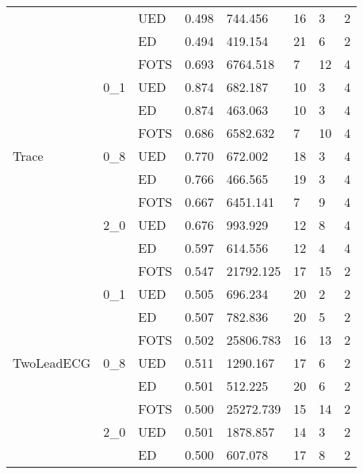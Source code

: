 \begin{tabular}{llllllll}
           &     & UED & 0.498 &   744.456 &             16 &            3 &           2 \\
           &     & ED & 0.494 &   419.154 &             21 &            6 &           2 \\
\cline{1-8}
\cline{2-8}
\multirow{9}{*}{Trace} & \multirow{3}{*}{0\_1} & FOTS & 0.693 &  6764.518 &              7 &           12 &           4 \\
           &     & UED & 0.874 &   682.187 &             10 &            3 &           4 \\
           &     & ED & 0.874 &   463.063 &             10 &            3 &           4 \\
\cline{2-8}
           & \multirow{3}{*}{0\_8} & FOTS & 0.686 &  6582.632 &              7 &           10 &           4 \\
           &     & UED & 0.770 &   672.002 &             18 &            3 &           4 \\
           &     & ED & 0.766 &   466.565 &             19 &            3 &           4 \\
\cline{2-8}
           & \multirow{3}{*}{2\_0} & FOTS & 0.667 &  6451.141 &              7 &            9 &           4 \\
           &     & UED & 0.676 &   993.929 &             12 &            8 &           4 \\
           &     & ED & 0.597 &   614.556 &             12 &            4 &           4 \\
\cline{1-8}
\cline{2-8}
\multirow{9}{*}{TwoLeadECG} & \multirow{3}{*}{0\_1} & FOTS & 0.547 & 21792.125 &             17 &           15 &           2 \\
           &     & UED & 0.505 &   696.234 &             20 &            2 &           2 \\
           &     & ED & 0.507 &   782.836 &             20 &            5 &           2 \\
\cline{2-8}
           & \multirow{3}{*}{0\_8} & FOTS & 0.502 & 25806.783 &             16 &           13 &           2 \\
           &     & UED & 0.511 &  1290.167 &             17 &            6 &           2 \\
           &     & ED & 0.501 &   512.225 &             20 &            6 &           2 \\
\cline{2-8}
           & \multirow{3}{*}{2\_0} & FOTS & 0.500 & 25272.739 &             15 &           14 &           2 \\
           &     & UED & 0.501 &  1878.857 &             14 &            3 &           2 \\
           &     & ED & 0.500 &   607.078 &             17 &            8 &           2 \\
\bottomrule
\end{tabular}
